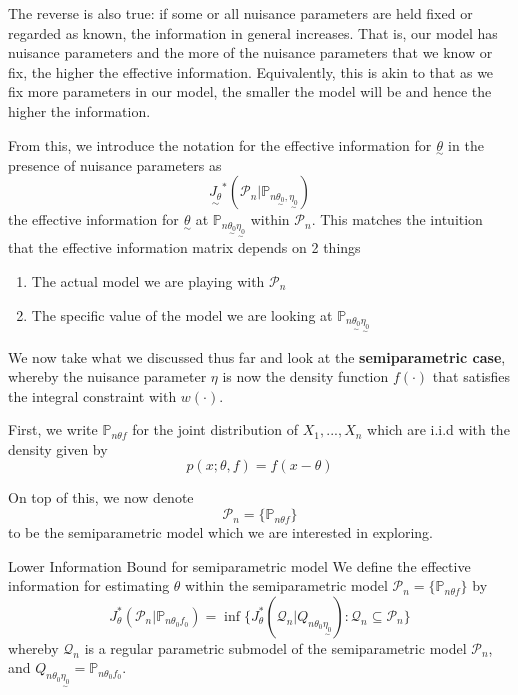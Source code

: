 \documentclass[twoside]{article}
\newcommand{\prob}{\mathbb{P}}
\newcommand{\utilde}{\underset{\sim}}
\begin{document}
The reverse is also true: if some or all nuisance parameters are held fixed or regarded as known, the information in general increases. That is, our model has nuisance parameters and the more of the nuisance parameters that we know or fix, the higher the effective information. Equivalently, this is akin to that as we fix more parameters in our model, the smaller the model will be and hence the higher the information. 

From this, we introduce the notation for the effective information for $\utilde{\theta}$ in the presence of nuisance parameters as
\begin{equation}
  \utilde{J_{\theta}}^{*}(\mathcal{P}_{n}| \prob_{n \utilde{\theta_{0}}, \utilde{\eta_{0}}})
\end{equation}
the effective information for $\utilde{\theta}$ at $\prob_{n \utilde{\theta_{0}}\utilde{\eta_{0}}}$ within $\mathcal{P}_{n}.$ This matches the intuition that the effective information matrix depends on 2 things 
\begin{enumerate}
  \item The actual model we are playing with $\mathcal{P}_n$
  \item The specific value of the model we are looking at $\prob_{n \utilde{\theta_{0}}\utilde{\eta_{0}}}$
\end{enumerate}

We now take what we discussed thus far and look at the \textbf{semiparametric case}, whereby the nuisance parameter $\eta$ is now the density function $f(\cdot)$ that satisfies the integral constraint with $w(\cdot).$

First, we write $\prob_{n \theta f}$ for the joint distribution of $X_1, ..., X_n$ which are i.i.d with the density given by
\begin{equation}
  p(x;\theta,f) = f(x - \theta)
\end{equation}

On top of this, we now denote 
\begin{equation}
\mathcal{P}_n = \{\prob_{n\theta f}\}
\end{equation}
to be the semiparametric model which we are interested in exploring.

\begin{definition_exam}{Lower Information Bound for semiparametric model}{} We define the effective information for estimating $\theta$ within the semiparametric model $\mathcal{P}_{n} = \{\prob_{n\theta f}\}$ by 
\begin{equation}
  J_{\theta}^{*}(\mathcal{P}_{n}| \prob_{n \theta_{0} f_{0}}) = \inf \{J_{\theta}^{*}(\mathcal{Q}_n|Q_{n \theta_{0} \utilde{\eta_{0}}}): \mathcal{Q}_n \subseteq \mathcal{P}_n\} 
\end{equation}
whereby $\mathcal{Q}_n$ is a regular parametric submodel of the semiparametric model $\mathcal{P}_n$, and $Q_{n \theta_{0} \utilde{\eta_{0}}} = \prob_{n \theta_{0} f_{0}}$.
\end{definition_exam}
\end{document}

